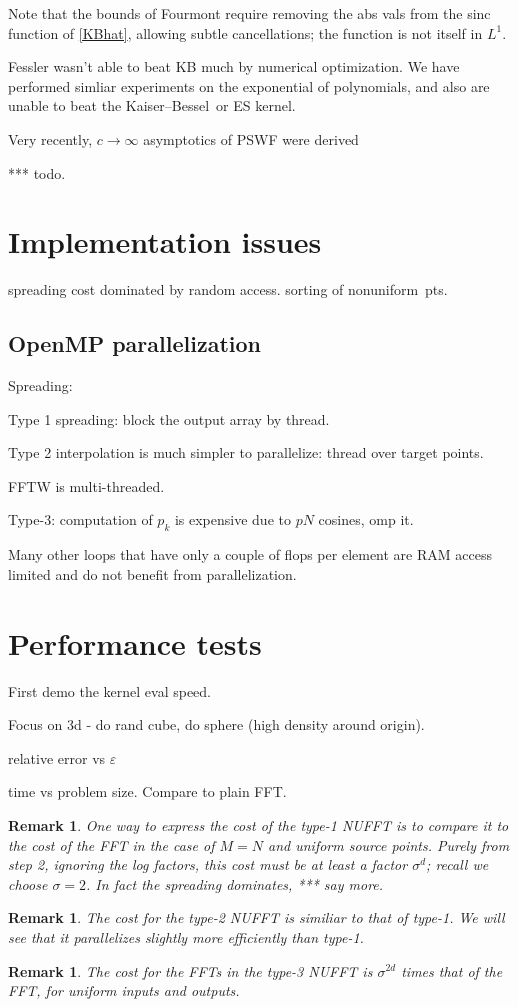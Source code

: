 \documentclass[10pt]{article}
\newcommand{\eps}{\varepsilon}
\newtheorem{rmk}[thm]{Remark}
\newcommand{\rat}{\sigma}          %
\newcommand{\NU}{{nonuniform}}       %
\newcommand{\KB}{Kaiser--Bessel}
\begin{document}
Note that the bounds of Fourmont require removing the abs vals
from the sinc function of \eqref{KBhat}, allowing subtle cancellations;
the function is not itself in $L^1$.

Fessler wasn't able to beat KB much by numerical optimization.
We have performed simliar experiments on the
exponential of polynomials, and also are unable to beat the \KB\ or
ES kernel.

Very recently, $c\to\infty$ asymptotics of PSWF were derived

*** todo.


\section{Implementation issues}

spreading cost dominated by random access.
sorting of \NU\ pts.

\subsection{OpenMP parallelization}

Spreading:

Type 1 spreading:
block the output array by thread.

Type 2 interpolation is much simpler to parallelize:
thread over target points.

FFTW is multi-threaded.

Type-3:
computation of $p_k$ is expensive due to $pN$ cosines,
omp it.

Many other loops that have only a couple of flops
per element are RAM access limited and do not benefit
from parallelization.


\section{Performance tests}

First demo the kernel eval speed.

Focus on 3d - do rand cube, do sphere (high density around origin).



relative error vs $\eps$

time vs problem size.
Compare to plain FFT.

\begin{rmk}
  One way to express the cost of the type-1 NUFFT
  is to compare it to the cost of the FFT in the case of $M=N$
  and uniform source points.
  Purely from step 2, ignoring the log factors,
  this cost must be at least a factor $\rat^d$; recall we choose $\rat=2$.
  In fact the spreading dominates,
  *** say more.
\end{rmk}
\begin{rmk}
  The cost for the type-2 NUFFT is similiar to that of type-1.
  We will see that it parallelizes slightly more efficiently
  than type-1.
\end{rmk}
\begin{rmk}
  The cost for the FFTs in the type-3 NUFFT is $\rat^{2d}$ times that of
  the FFT, for uniform inputs and outputs.
\end{rmk}
\end{document}
